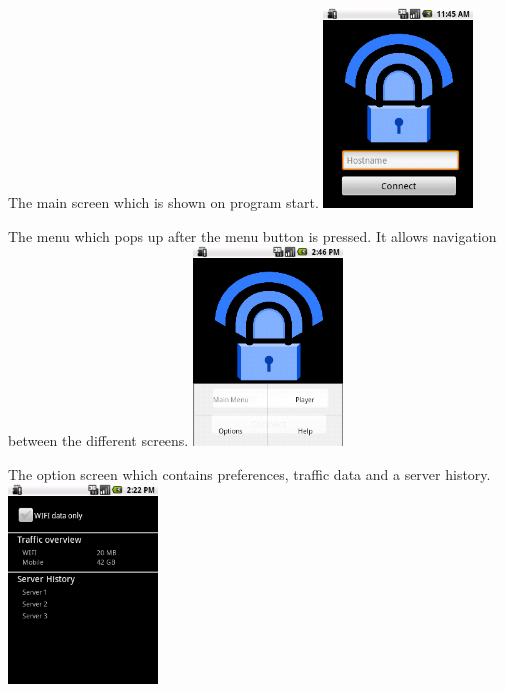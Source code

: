 \documentclass[a4paper,10pt]{scrartcl}
\begin{document}
\begin{illustration}{The main screen which is shown on program start.}
\includegraphics[width=150px]{figures/images/mainscreen.png}
\end{illustration}
\begin{illustration}{The menu which pops up after the menu button is pressed. It allows navigation between the different screens.}
\includegraphics[width=150px]{figures/images/menu.png}
\end{illustration}
\begin{illustration}{The option screen which contains preferences, traffic data and a server history.}
\includegraphics[width=150px]{figures/images/optionscreen.png}
\end{illustration}
\end{document}
